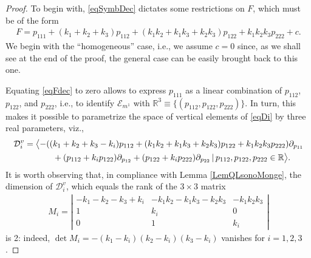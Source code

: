 \documentclass[pdftex]{sigma}
\newcommand{\R}{\mathbb{R}}
\newcommand{\D}{\mathcal{D}}
\newcommand{\E}{\mathcal{E}}
\numberwithin{equation}{section}
\begin{document}
\begin{proof}
To begin with, \eqref{eqSymbDec} dictates some restrictions on $F$, which must be of the form %
 \begin{gather}\label{eqFdec}
F=p_{111}+(k_1+k_2+k_3)p_{112}+(k_1k_2+k_1k_3+k_2k_3)p_{122}+k_1k_2k_3p_{222}+c.
\end{gather}
We begin with the ``homogeneous'' case, i.e., we assume $c=0$ since, as we shall see at the end of the proof, the general case can be easily brought back to this one.

Equating \eqref{eqFdec} to zero allows to express $p_{111}$ as a linear combination of $p_{112}$, $p_{122}$, and $p_{222}$, i.e., to identify $\E_{m^1}$ with $\R^3\equiv\{(p_{112},p_{122},p_{222})\}$. In turn, this makes it possible to parametrize the space of vertical elements of \eqref{eqDi} by three real parameters, viz.,
\begin{gather}
 \D_i^v= \big\langle{-}({ (k_1+k_2+k_3-k_i)p_{112}+(k_1k_2+k_1k_3+k_2k_3)p_{122}+ k_1k_2k_3p_{222}})\partial_{p_{11}} \nonumber\\
\hphantom{\D_i^v= \big\langle}{} +({ p_{112}+k_ip_{122}})\partial_{p_{12}}+({ p_{122}+k_ip_{222}})\partial_{p_{22}}\,|\, { p_{112},p_{122},p_{222}}\in\R\big\rangle. \label{eqDiPar}
\end{gather}
It is worth observing that, in compliance with Lemma \ref{LemQLsonoMonge}, the dimension of $\D_i^v$, which
equals the rank of the $3\times 3$ matrix
\begin{gather}\label{eqMi}
M_i=\left|\begin{matrix}-k_1-k_2-k_3+k_i & -k_1k_2-k_1k_3-k_2k_3 & -k_1k_2k_3 \\1 & k_i & 0 \\0 & 1 & k_i\end{matrix}\right|
\end{gather}
 is 2: indeed,
$\det M_i= -(k_1-k_i)(k_2-k_i)(k_3-k_i)$
vanishes for $i=1,2,3$.


\end{proof}
\end{document}

